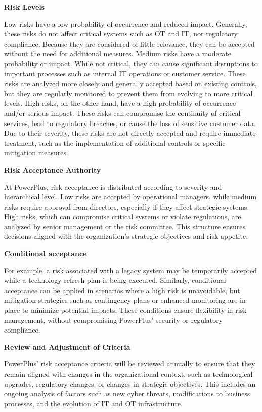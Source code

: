\textbf{Risk Levels}

Low risks have a low probability of occurrence and reduced impact. Generally, these risks do not affect critical systems such as OT and IT, nor regulatory compliance. Because they are considered of little relevance, they can be accepted without the need for additional measures.
Medium risks have a moderate probability or impact. While not critical, they can cause significant disruptions to important processes such as internal IT operations or customer service. These risks are analyzed more closely and generally accepted based on existing controls, but they are regularly monitored to prevent them from evolving to more critical levels.
High risks, on the other hand, have a high probability of occurrence and/or serious impact. These risks can compromise the continuity of critical services, lead to regulatory breaches, or cause the loss of sensitive customer data. Due to their severity, these risks are not directly accepted and require immediate treatment, such as the implementation of additional controls or specific mitigation measures.

\textbf{Risk Acceptance Authority}

At PowerPlus, risk acceptance is distributed according to severity and hierarchical level. Low risks are accepted by operational managers, while medium risks require approval from directors, especially if they affect strategic systems. High risks, which can compromise critical systems or violate regulations, are analyzed by senior management or the risk committee. This structure ensures decisions aligned with the organization's strategic objectives and risk appetite.

\textbf{Conditional acceptance}

For example, a risk associated with a legacy system may be temporarily accepted while a technology refresh plan is being executed. Similarly, conditional acceptance can be applied in scenarios where a high risk is unavoidable, but mitigation strategies such as contingency plans or enhanced monitoring are in place to minimize potential impacts.
These conditions ensure flexibility in risk management, without compromising PowerPlus' security or regulatory compliance.

\textbf{Review and Adjustment of Criteria}

PowerPlus' risk acceptance criteria will be reviewed annually to ensure that they remain aligned with changes in the organizational context, such as technological upgrades, regulatory changes, or changes in strategic objectives. This includes an ongoing analysis of factors such as new cyber threats, modifications to business processes, and the evolution of IT and OT infrastructure.


